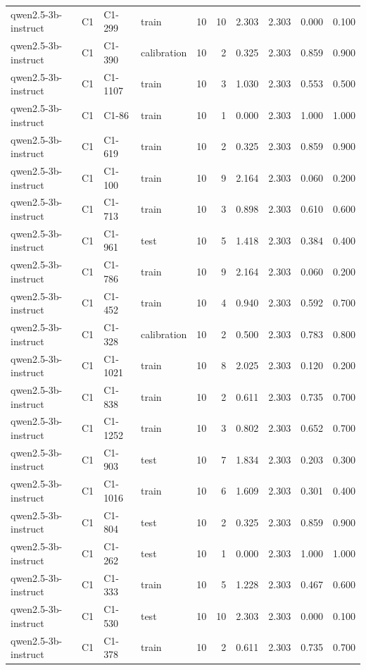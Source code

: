\begin{table}
\begin{tabular}{llllrrrrrr}
qwen2.5-3b-instruct & C1 & C1-299 & train & 10 & 10 & 2.303 & 2.303 & 0.000 & 0.100 \\
qwen2.5-3b-instruct & C1 & C1-390 & calibration & 10 & 2 & 0.325 & 2.303 & 0.859 & 0.900 \\
qwen2.5-3b-instruct & C1 & C1-1107 & train & 10 & 3 & 1.030 & 2.303 & 0.553 & 0.500 \\
qwen2.5-3b-instruct & C1 & C1-86 & train & 10 & 1 & 0.000 & 2.303 & 1.000 & 1.000 \\
qwen2.5-3b-instruct & C1 & C1-619 & train & 10 & 2 & 0.325 & 2.303 & 0.859 & 0.900 \\
qwen2.5-3b-instruct & C1 & C1-100 & train & 10 & 9 & 2.164 & 2.303 & 0.060 & 0.200 \\
qwen2.5-3b-instruct & C1 & C1-713 & train & 10 & 3 & 0.898 & 2.303 & 0.610 & 0.600 \\
qwen2.5-3b-instruct & C1 & C1-961 & test & 10 & 5 & 1.418 & 2.303 & 0.384 & 0.400 \\
qwen2.5-3b-instruct & C1 & C1-786 & train & 10 & 9 & 2.164 & 2.303 & 0.060 & 0.200 \\
qwen2.5-3b-instruct & C1 & C1-452 & train & 10 & 4 & 0.940 & 2.303 & 0.592 & 0.700 \\
qwen2.5-3b-instruct & C1 & C1-328 & calibration & 10 & 2 & 0.500 & 2.303 & 0.783 & 0.800 \\
qwen2.5-3b-instruct & C1 & C1-1021 & train & 10 & 8 & 2.025 & 2.303 & 0.120 & 0.200 \\
qwen2.5-3b-instruct & C1 & C1-838 & train & 10 & 2 & 0.611 & 2.303 & 0.735 & 0.700 \\
qwen2.5-3b-instruct & C1 & C1-1252 & train & 10 & 3 & 0.802 & 2.303 & 0.652 & 0.700 \\
qwen2.5-3b-instruct & C1 & C1-903 & test & 10 & 7 & 1.834 & 2.303 & 0.203 & 0.300 \\
qwen2.5-3b-instruct & C1 & C1-1016 & train & 10 & 6 & 1.609 & 2.303 & 0.301 & 0.400 \\
qwen2.5-3b-instruct & C1 & C1-804 & test & 10 & 2 & 0.325 & 2.303 & 0.859 & 0.900 \\
qwen2.5-3b-instruct & C1 & C1-262 & test & 10 & 1 & 0.000 & 2.303 & 1.000 & 1.000 \\
qwen2.5-3b-instruct & C1 & C1-333 & train & 10 & 5 & 1.228 & 2.303 & 0.467 & 0.600 \\
qwen2.5-3b-instruct & C1 & C1-530 & test & 10 & 10 & 2.303 & 2.303 & 0.000 & 0.100 \\
qwen2.5-3b-instruct & C1 & C1-378 & train & 10 & 2 & 0.611 & 2.303 & 0.735 & 0.700 \\

\end{tabular}
\end{table}
